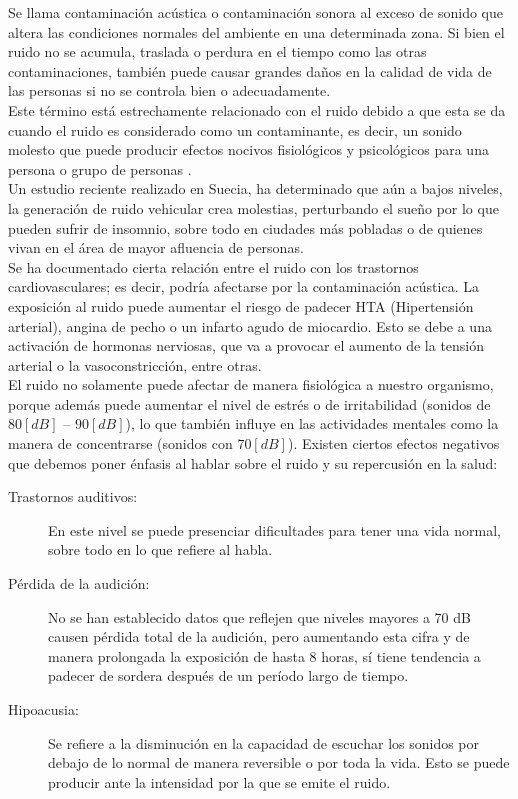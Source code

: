 \documentclass[letter,11pt]{article}
\begin{document}
Se llama contaminación acústica o contaminación sonora al exceso de sonido que
altera las condiciones normales del ambiente en una determinada zona. Si bien
el ruido no se acumula, traslada o perdura en el tiempo como las otras
contaminaciones, también puede causar grandes daños en la calidad de vida de
las personas si no se controla bien o adecuadamente.
\\

Este término está estrechamente relacionado con el ruido debido a que esta se da
cuando el ruido es considerado como un contaminante, es decir, un sonido molesto
que puede producir efectos nocivos fisiológicos y psicológicos para una persona
o grupo de personas \cite{WIKI3}.
\\

Un estudio reciente realizado en Suecia, ha determinado que aún a bajos niveles,
la generación de ruido vehicular crea molestias, perturbando el sueño por lo que
pueden sufrir de insomnio, sobre todo en ciudades más pobladas o de quienes
vivan en el área de mayor afluencia de personas.
\\

Se ha documentado cierta relación entre el ruido con los trastornos
cardiovasculares; es decir, podría afectarse por la contaminación acústica. La
exposición al ruido puede aumentar el riesgo de padecer HTA (Hipertensión
arterial), angina de pecho o un infarto agudo de miocardio. Esto se debe a una
activación de hormonas nerviosas, que va a provocar el aumento de la tensión
arterial o la vasoconstricción, entre otras.
\\

El ruido no solamente puede afectar de manera fisiológica a nuestro organismo,
porque además puede aumentar el nivel de estrés o de irritabilidad (sonidos de
$80 [dB]$ – $90 [dB]$), lo que también influye en las actividades mentales como
la manera de concentrarse (sonidos con $70 [dB]$). Existen ciertos efectos
negativos que debemos poner énfasis al hablar sobre el ruido y su repercusión en
la salud:

\begin{description}
\item [Trastornos auditivos:]
En este nivel se puede presenciar dificultades para tener una vida normal, sobre
todo en lo que refiere al habla.

\item [Pérdida de la audición:]
No se han establecido datos que reflejen que niveles mayores a 70 dB causen
pérdida total de la audición, pero aumentando esta cifra y de manera prolongada
la exposición de hasta 8 horas, sí tiene tendencia a padecer de sordera después
de un período largo de tiempo.

\item [Hipoacusia:]
Se refiere a la disminución en la capacidad de escuchar los sonidos por debajo
de lo normal de manera reversible o por toda la vida. Esto se puede producir
ante la intensidad por la que se emite el ruido.
\end{description}
\end{document}
